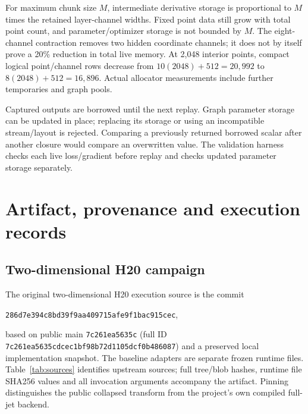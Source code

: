 \documentclass[11pt]{article}
\begin{document}
For maximum chunk size $M$, intermediate derivative storage is proportional
to $M$ times the retained layer-channel widths. Fixed point data still grow
with total point count, and parameter/optimizer storage is not bounded by
$M$. The eight-channel contraction removes two hidden coordinate channels;
it does not by itself prove a 20\% reduction in total live memory. At 2,048
interior points, compact logical point/channel rows decrease from
$10(2048)+512=20,992$ to $8(2048)+512=16,896$. Actual allocator measurements
include further temporaries and graph pools.

Captured outputs are borrowed until the next replay. Graph parameter
storage can be updated in place; replacing its storage or using an
incompatible stream/layout is rejected. Comparing a previously returned
borrowed scalar after another closure would compare an overwritten value.
The validation harness checks each live loss/gradient before replay and
checks updated parameter storage separately.

\section{Artifact, provenance and execution records}\label{app:records}
\subsection{Two-dimensional H20 campaign}
The original two-dimensional H20 execution source is the commit
\begin{center}\small\texttt{286d7e394c8bd39f9aa409715afe9f1bac915cec},\end{center}
based on public main \texttt{7c261ea5635c} (full ID
\texttt{7c261ea5635cdcec1bf98b72d1105dcf0b486087}) and a preserved local
implementation snapshot. The baseline adapters are separate frozen runtime
files. Table~\ref{tab:sources} identifies upstream sources; full tree/blob
hashes, runtime file SHA256 values and all invocation arguments accompany
the artifact. Pinning distinguishes the public collapsed transform from
the project's own compiled full-jet backend.
\end{document}
